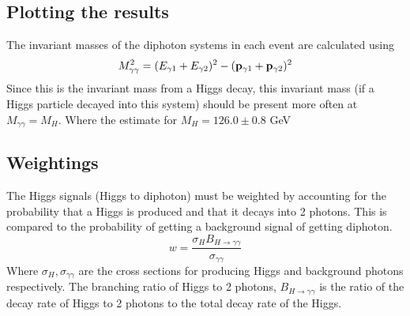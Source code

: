 \documentclass{article}
\begin{document}
\subsection{Plotting the results}
The invariant masses of the diphoton systems in each event are calculated using
\begin{equation}
M_{\gamma \gamma}^2 = (E_{\gamma 1} + E_{\gamma 2})^2 - ({\bf p}_{\gamma 1} + {\bf p}_{\gamma 2})^2
\end{equation}
Since this is the invariant mass from a Higgs decay, this invariant mass (if a Higgs particle decayed into this system) should be present more often at $M_{\gamma \gamma} = M_{H}$. Where the estimate for $M_{H} = 126.0 \pm 0.8$ GeV \cite[p.~1]{higgs2012}
\subsection{Weightings}
The Higgs signals (Higgs to diphoton) must be weighted by accounting for the probability that a Higgs is produced and that it decays into 2 photons. This is compared to the probability of getting a background signal of getting diphoton.
\begin{equation}
w = \frac{\sigma_{H} B_{H \rightarrow \gamma \gamma}}{\sigma_{\gamma \gamma}}
\end{equation}
Where $\sigma_{H}, \sigma_{\gamma \gamma}$ are the cross sections for producing Higgs and background photons respectively. The branching ratio of Higgs to 2 photons, $B_{H \rightarrow \gamma \gamma}$ is the ratio of the decay rate of Higgs to 2 photons to the total decay rate of the Higgs.
\end{document}
